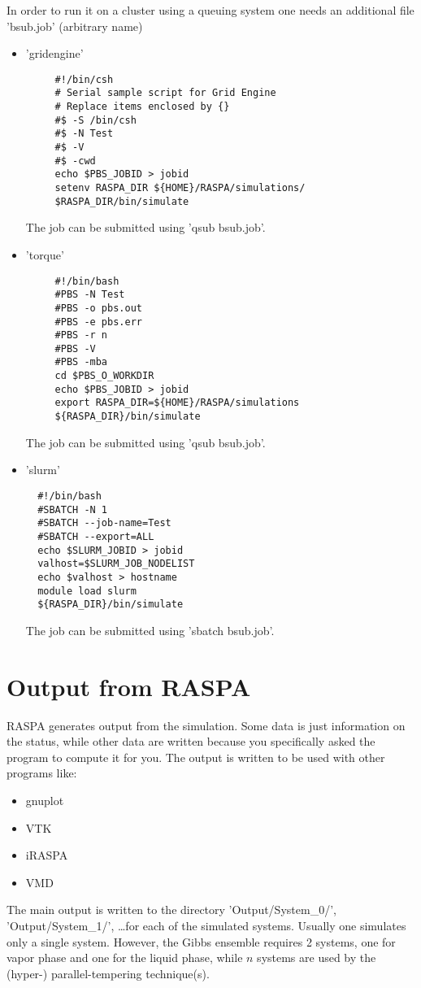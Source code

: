 In order to run it on a cluster using a queuing system one needs an additional file 'bsub.job' (arbitrary name)
\begin{itemize}
 \item{'gridengine'}
  \begin{verbatim}
     #!/bin/csh
     # Serial sample script for Grid Engine
     # Replace items enclosed by {}
     #$ -S /bin/csh
     #$ -N Test
     #$ -V
     #$ -cwd
     echo $PBS_JOBID > jobid
     setenv RASPA_DIR ${HOME}/RASPA/simulations/
     $RASPA_DIR/bin/simulate
  \end{verbatim}
The job can be submitted using 'qsub bsub.job'.
 \item{'torque'}
  \begin{verbatim}
     #!/bin/bash
     #PBS -N Test
     #PBS -o pbs.out
     #PBS -e pbs.err
     #PBS -r n
     #PBS -V
     #PBS -mba
     cd $PBS_O_WORKDIR
     echo $PBS_JOBID > jobid
     export RASPA_DIR=${HOME}/RASPA/simulations
     ${RASPA_DIR}/bin/simulate
  \end{verbatim}
The job can be submitted using 'qsub bsub.job'.
 \item{'slurm'}
\begin{verbatim}
  #!/bin/bash 
  #SBATCH -N 1
  #SBATCH --job-name=Test
  #SBATCH --export=ALL
  echo $SLURM_JOBID > jobid
  valhost=$SLURM_JOB_NODELIST
  echo $valhost > hostname
  module load slurm
  ${RASPA_DIR}/bin/simulate
\end{verbatim}
The job can be submitted using 'sbatch bsub.job'.
\end{itemize}


\section{Output from RASPA}
RASPA generates output from the simulation. Some data is just information on the status, while other data are written because you
specifically asked the program to compute it for you. The output is written to be used with other programs like:
\begin{itemize}
 \item{gnuplot}
 \item{VTK}
 \item{iRASPA}
 \item{VMD}
\end{itemize}

The main output is written to the directory 'Output/System\_0/', 'Output/System\_1/', \dots for each of the simulated
systems. Usually one simulates only a single system. However, the Gibbs ensemble requires 2 systems, one for vapor phase and one
for the liquid phase, while $n$ systems are used by the (hyper-) parallel-tempering technique(s).

